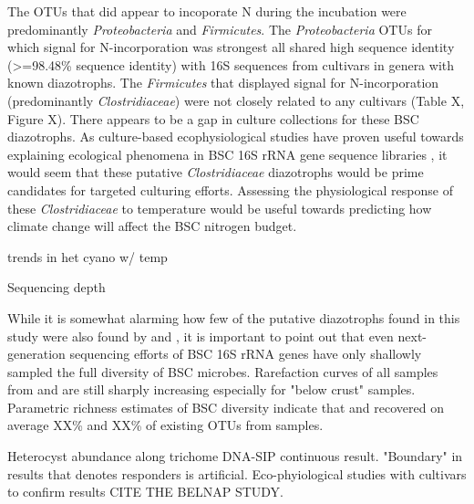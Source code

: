 The OTUs that did appear to incoporate N during the incubation were predominantly \textit{Proteobacteria} and \textit{Firmicutes}. The \textit{Proteobacteria} OTUs for which signal for N-incorporation was strongest all shared high sequence identity (\textgreater=98.48\% sequence identity) with 16S sequences from cultivars in genera with known diazotrophs. The \textit{Firmicutes} that displayed signal for N-incorporation (predominantly \textit{Clostridiaceae}) were not closely related to any cultivars (Table X, Figure X). There appears to be a gap in culture collections for these BSC diazotrophs. As culture-based ecophysiological studies have proven useful towards explaining ecological phenomena in BSC 16S rRNA gene sequence libraries \cite{Garcia_Pichel_2013}, it would seem that these putative \textit{Clostridiaceae} diazotrophs would be prime candidates for targeted culturing efforts. Assessing the physiological response of these \textit{Clostridiaceae} to temperature would be useful towards predicting how climate change will affect the BSC nitrogen budget.   

\cite{Yeager_2012} trends in het cyano w/ temp

Sequencing depth

While it is somewhat alarming how few of the putative diazotrophs found in this study were also found by \citet{Garcia_Pichel_2013} and \citet{Steven_2013}, it is important to point out that even next-generation sequencing efforts of BSC 16S rRNA genes have only shallowly sampled the full diversity of BSC microbes. Rarefaction curves of all samples from \citet{Steven_2013} and \citet{Garcia_Pichel_2013} are still sharply increasing especially for "below crust" samples. Parametric richness estimates of BSC diversity indicate that \citet{Steven_2013} and \citet{Garcia_Pichel_2013} recovered on average XX\% and XX\% of existing OTUs from samples.

Heterocyst abundance along trichome
DNA-SIP continuous result. "Boundary" in results that denotes responders is artificial. Eco-phyiological studies with cultivars to confirm results CITE THE BELNAP STUDY.

